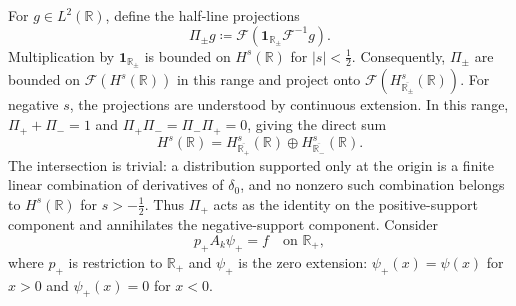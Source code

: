 \documentclass[11pt,reqno]{amsart}
\theoremstyle{plain}
\theoremstyle{definition}
\numberwithin{equation}{section}
\newcommand{\R}{\mathbb{R}}
\begin{document}
For $g\in L^2(\R)$, define the half-line projections
\begin{equation}\label{eq:Pi-support-projections}
    \Pi_\pm g
    \coloneqq
    \mathcal F\!\left(
    \mathbf1_{\R_\pm}\mathcal F^{-1}g
    \right).
\end{equation}
Multiplication by $\mathbf1_{\R_\pm}$ is bounded on $H^s(\R)$ for
$|s|<\frac12$. Consequently, $\Pi_\pm$ are bounded on
$\mathcal F(H^s(\R))$ in this range and project onto
$\mathcal F(H^s_{\overline{\R_\pm}}(\R))$. For negative $s$, the
projections are understood by continuous extension. In this range,
$\Pi_++\Pi_-=1$ and $\Pi_+\Pi_-=\Pi_-\Pi_+=0$, giving the direct sum
\begin{equation*}
    H^s(\R)=H^s_{\overline{\R_+}}(\R)
    \oplus H^s_{\overline{\R_-}}(\R).
\end{equation*}
The intersection is trivial: a distribution supported only at the origin
is a finite linear combination of derivatives of $\delta_0$, and no
nonzero such combination belongs to $H^s(\R)$ for $s>-\frac12$. Thus $\Pi_+$ acts as the identity on the positive-support
component and annihilates the negative-support component.
Consider
\begin{equation}\label{eq:A-orderk-halfline}
    p_+ A_k\psi_+ = f \quad \text{on } \R_+,
\end{equation}
where $p_+$ is restriction to $\R_+$ and $\psi_+$ is the zero extension:
$\psi_+(x)=\psi(x)$ for $x>0$ and $\psi_+(x)=0$ for $x<0$.
\end{document}
